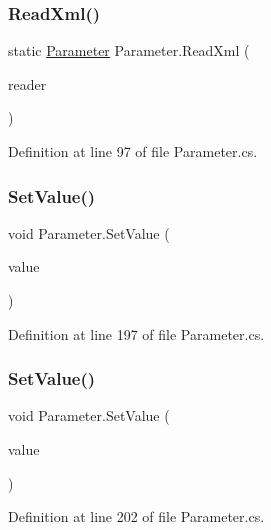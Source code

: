 \subsubsection{\texorpdfstring{Read\+Xml()}{ReadXml()}}
{\footnotesize\ttfamily static \hyperlink{class_parameter}{Parameter} Parameter.\+Read\+Xml (\begin{DoxyParamCaption}\item[{Xml\+Reader}]{reader }\end{DoxyParamCaption})\hspace{0.3cm}{\ttfamily [static]}}



Definition at line 97 of file Parameter.\+cs.

\mbox{\label{class_parameter_a0330e2d85929bca7972756d18fb67a87}} 
\subsubsection{\texorpdfstring{Set\+Value()}{SetValue()}\hspace{0.1cm}{\footnotesize\ttfamily [1/2]}}
{\footnotesize\ttfamily void Parameter.\+Set\+Value (\begin{DoxyParamCaption}\item[{string}]{value }\end{DoxyParamCaption})}



Definition at line 197 of file Parameter.\+cs.

\mbox{\label{class_parameter_ad37b3fd4f190efb91cda8dc79fd3078d}} 
\subsubsection{\texorpdfstring{Set\+Value()}{SetValue()}\hspace{0.1cm}{\footnotesize\ttfamily [2/2]}}
{\footnotesize\ttfamily void Parameter.\+Set\+Value (\begin{DoxyParamCaption}\item[{object}]{value }\end{DoxyParamCaption})}



Definition at line 202 of file Parameter.\+cs.

